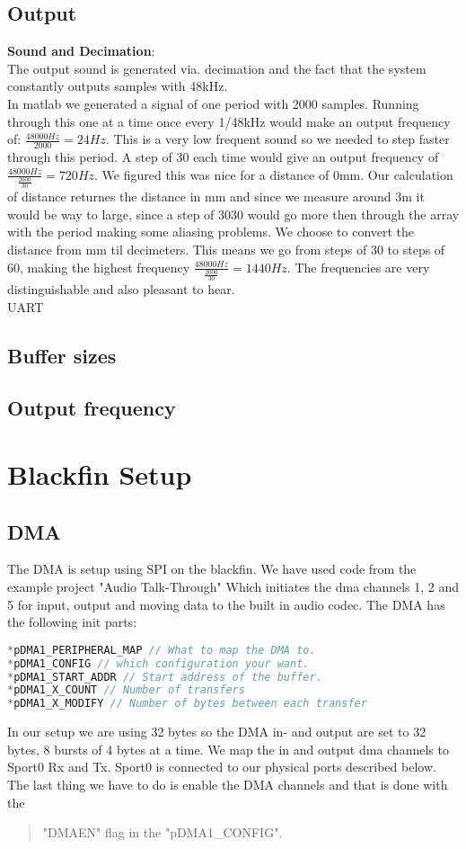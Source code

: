 \subsection{Output}
\textbf{Sound and Decimation}:\\
The output sound is generated via. decimation and the fact that the system constantly outputs samples with 48kHz.\\
In matlab we generated a signal of one period with 2000 samples. Running through this one at a time once every 1/48kHz would make an output frequency of: $\frac{48000Hz}{2000}=24Hz$. This is a very low frequent sound so we needed to step faster through this period. A step of 30 each time would give an output frequency of $\frac{48000Hz}{\frac{2000}{30}}=720Hz$. We figured this was nice for a distance of 0mm. Our calculation of distance returnes the distance in mm and since we measure around 3m it would be way to large, since a step of 3030 would go more then through the array with the period making some aliasing problems. We choose to convert the distance from mm til decimeters. This means we go from steps of 30 to steps of 60, making the highest frequency $\frac{48000Hz}{\frac{2000}{30}}=1440Hz$. The frequencies are very distinguishable and also pleasant to hear.\\
UART\\
\subsection{Buffer sizes}

\subsection{Output frequency}
\section{Blackfin Setup}
\subsection{DMA}
The DMA is setup using SPI on the blackfin. We have used code from the example project "Audio Talk-Through" Which initiates the dma channels 1, 2 and 5 for input, output and moving data to the built in audio codec. The DMA has the following init parts:
\begin{lstlisting}[language=C]
*pDMA1_PERIPHERAL_MAP // What to map the DMA to.
*pDMA1_CONFIG // which configuration your want.
*pDMA1_START_ADDR // Start address of the buffer.
*pDMA1_X_COUNT // Number of transfers
*pDMA1_X_MODIFY // Number of bytes between each transfer
\end{lstlisting}
In our setup we are using 32 bytes so the DMA in- and output are set to 32 bytes, 8 bursts of 4 bytes at a time. We map the in and output dma channels to Sport0 Rx and Tx. Sport0 is connected to our physical ports described below. The last thing we have to do is enable the DMA channels and that is done with the \begin{quote}
"DMAEN" flag in the "pDMA1\_CONFIG".
\end{quote}
